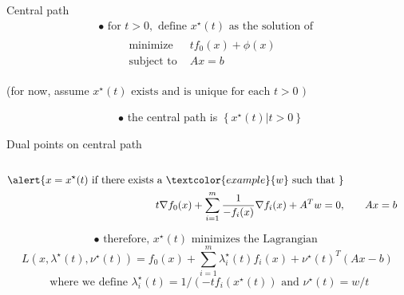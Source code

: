 \documentclass{beamer}
\begin{document}
\begin{frame}[noframenumbering]{Central path}
\begin{equation*}
\begin{aligned} \bullet \text { for } t>0, \text { define } x^{\star}(t) \text { as the solution of } \\ \qquad \begin{array}{ll}{\text { minimize }} & {t f_{0}(x)+\phi(x)} \\ {\text { subject to }} & {A x=b}\end{array} \end{aligned}
\end{equation*}

 (for now, assume $ x^{\star}(t) \text { exists and is unique for each } t>0 \text { ) }
$
 
~~~~~~~~~~~~~~~~~~~~$\bullet$  the central path is $\left\{x^{\star}(t) | t>0\right\}
$
\end{frame}
\begin{frame}[noframenumbering]{Dual points on central path}
\begin{equation*}
\begin{aligned} \\\alert {x=x^{\star}(t) \text { if there exists a } \textcolor{example}{w} \text { such that }} \\ \qquad t \nabla f_{0}(x)+\sum_{i=1}^{m} \frac{1}{-f_{i}(x)} \nabla f_{i}(x)+A^{T} w=0, & \qquad A x=b \end{aligned}
\end{equation*}

\begin{equation*}
\bullet \text { therefore, } x^{\star}(t) \text { minimizes the Lagrangian }
\end{equation*}
\begin{equation}
L\left(x, \lambda^{\star}(t), \nu^{\star}(t)\right)=f_{0}(x)+\sum_{i=1}^{m} \lambda_{i}^{\star}(t) f_{i}(x)+\nu^{\star}(t)^{T}(A x-b)
\end{equation}
\begin{equation*}
\text { where we define } \lambda_{i}^{\star}(t)=1 /\left(-t f_{i}\left(x^{\star}(t)\right) \text { and } \nu^{\star}(t)=w / t\right.
\end{equation*}
\end{frame}
\end{document}
